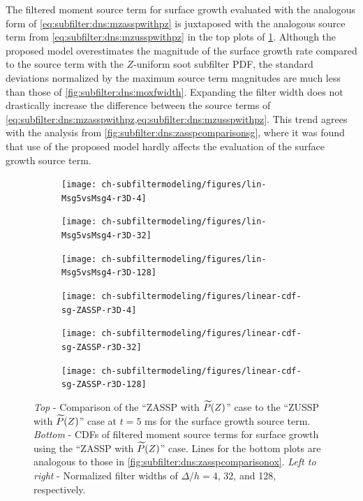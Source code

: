 The filtered moment source term for surface growth evaluated with the analogous form of \cref{eq:subfilter:dns:mzasspwithpz} is juxtaposed with the analogous source term from \cref{eq:subfilter:dns:mzusspwithpz} in the top plots of \cref{fig:subfilter:dns:msgfwidth}. Although the proposed model overestimates the magnitude of the surface growth rate compared to the source term with the $Z$-uniform soot subfilter PDF, the standard deviations normalized by the maximum source term magnitudes are much less than those of \cref{fig:subfilter:dns:moxfwidth}. Expanding the filter width does not drastically increase the difference between the source terms of \cref{eq:subfilter:dns:mzasspwithpz,eq:subfilter:dns:mzusspwithpz}. This trend agrees with the analysis from \cref{fig:subfilter:dns:zasspcomparisonsg}, where it was found that use of the proposed model hardly affects the evaluation of the surface growth source term. %

\begin{figure}[ht]
  \centering
  \begin{subfigure}[b]{0.33\linewidth}
    \centering
    \texttt{[image: ch-subfiltermodeling/figures/lin-Msg5vsMsg4-r3D-4]}
  \end{subfigure}%
  \begin{subfigure}[b]{0.33\linewidth}
    \centering
    \texttt{[image: ch-subfiltermodeling/figures/lin-Msg5vsMsg4-r3D-32]}
  \end{subfigure}%
  \begin{subfigure}[b]{0.33\linewidth}
    \centering
    \texttt{[image: ch-subfiltermodeling/figures/lin-Msg5vsMsg4-r3D-128]}
  \end{subfigure}
  \begin{subfigure}[b]{0.33\linewidth}
    \centering
    \texttt{[image: ch-subfiltermodeling/figures/linear-cdf-sg-ZASSP-r3D-4]}
  \end{subfigure}%
  \begin{subfigure}[b]{0.33\linewidth}
    \centering
    \texttt{[image: ch-subfiltermodeling/figures/linear-cdf-sg-ZASSP-r3D-32]}
  \end{subfigure}%
  \begin{subfigure}[b]{0.33\linewidth}
    \centering
    \texttt{[image: ch-subfiltermodeling/figures/linear-cdf-sg-ZASSP-r3D-128]}
  \end{subfigure}
  \caption[\texorpdfstring{$\fst[M]{1,0}^{sg}$}{M1,0sg} Using ZASSP with $\pz$ for Various \texorpdfstring{$\Delta/h$}{D/h}]{\textit{Top} - Comparison of the ``ZASSP with $\pz$'' case to the ``ZUSSP with $\pz$'' case at $t = 5$ ms for the surface growth source term. \textit{Bottom} - CDFs of filtered moment source terms for surface growth using the ``ZASSP with $\pz$'' case. Lines for the bottom plots are analogous to those in \cref{fig:subfilter:dns:zasspcomparisonox}. \textit{Left to right} - Normalized filter widths of $\Delta/h = 4$, 32, and 128, respectively.}
  \label{fig:subfilter:dns:msgfwidth}
\end{figure}
